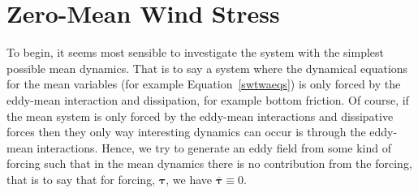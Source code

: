 \documentclass[12pt,a4paper]{report}
\newcommand*\thkmean[1]{\overline{#1}}
\newcommand*\equref[1]{Equation~\eqref{#1}}
\begin{document}



\section{Zero-Mean Wind Stress}

\label{stochwind}

To begin, it seems most sensible to investigate the 
system with the simplest possible mean dynamics.
That is to say a system where the dynamical equations 
for the mean variables (for example \equref{swtwaeqs}) is 
only forced by the eddy-mean interaction and dissipation,
for example bottom friction. Of course, if the mean system is
only forced by the eddy-mean interactions and dissipative forces
then they only way interesting dynamics can occur
is through the eddy-mean interactions. Hence, we try to
generate an eddy field from some kind of forcing such that in the mean 
dynamics there is no contribution from the forcing, that is to say
that for forcing, $\boldsymbol{\tau}$, we have $\thkmean{\boldsymbol{\tau}}\equiv0$.
\end{document}
